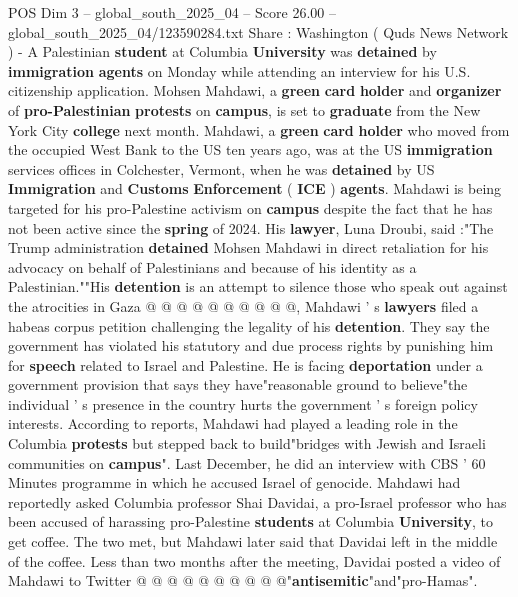 \begin{textsample}{POS Dim 3 – global\_south\_2025\_04 – Score 26.00 – global\_south\_2025\_04/123590284.txt}  \label{ex:f3_pos_113}
Share : Washington ( Quds News Network ) - A Palestinian \textbf{student} at Columbia \textbf{University} was \textbf{detained} by \textbf{immigration} \textbf{agents} on Monday while attending an interview for his U.S. citizenship application.
Mohsen Mahdawi, a \textbf{green} \textbf{card} \textbf{holder} and \textbf{organizer} of \textbf{pro-Palestinian} \textbf{protests} on \textbf{campus}, is set to \textbf{graduate} from the New York City \textbf{college} next month.
Mahdawi, a \textbf{green} \textbf{card} \textbf{holder} who moved from the occupied West Bank to the US ten years ago, was at the US \textbf{immigration} services offices in Colchester, Vermont, when he was \textbf{detained} by US \textbf{Immigration} and \textbf{Customs} \textbf{Enforcement} ( \textbf{ICE} ) \textbf{agents}.
Mahdawi is being targeted for his pro-Palestine activism on \textbf{campus} despite the fact that he has not been active since the \textbf{spring} of 2024.
His \textbf{lawyer}, Luna Droubi, said :"The Trump administration \textbf{detained} Mohsen Mahdawi in direct retaliation for his advocacy on behalf of Palestinians and because of his identity as a Palestinian.""His \textbf{detention} is an attempt to silence those who speak out against the atrocities in Gaza @ @ @ @ @ @ @ @ @ @, Mahdawi ' s \textbf{lawyers} filed a habeas corpus petition challenging the legality of his \textbf{detention}.
They say the government has violated his statutory and due process rights by punishing him for \textbf{speech} related to Israel and Palestine.
He is facing \textbf{deportation} under a government provision that says they have"reasonable ground to believe"the individual ' s presence in the country hurts the government ' s foreign policy interests.
According to reports, Mahdawi had played a leading role in the Columbia \textbf{protests} but stepped back to build"bridges with Jewish and Israeli communities on \textbf{campus}".
Last December, he did an interview with CBS ' 60 Minutes programme in which he accused Israel of genocide.
Mahdawi had reportedly asked Columbia professor Shai Davidai, a pro-Israel professor who has been accused of harassing pro-Palestine \textbf{students} at Columbia \textbf{University}, to get coffee.
The two met, but Mahdawi later said that Davidai left in the middle of the coffee.
Less than two months after the meeting, Davidai posted a video of Mahdawi to Twitter @ @ @ @ @ @ @ @ @ @"\textbf{antisemitic}"and"pro-Hamas".

\end{textsample}
